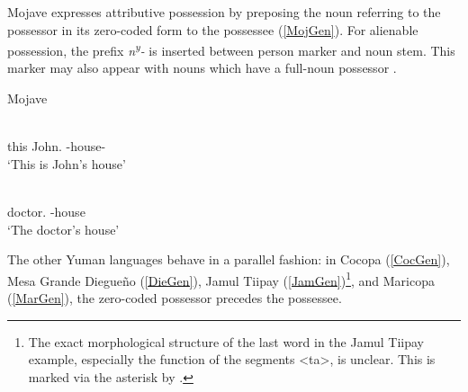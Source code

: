 Mojave expresses attributive possession by preposing the noun referring to the possessor in its zero-coded form  to the possessee (\ref{MojGen}).
For alienable possession, the prefix \emph{n\textsuperscript{y}-} is inserted between person marker and noun stem. 
This marker may also appear with nouns which have a full-noun possessor \citep[16--18]{Munro:1976}.

\begin{exe}\ex\label{MojGen} {Mojave} \citep[50, 18]{Munro:1976}\nopagebreak[4]
\begin{xlist}\ex\gll {} \textbf{} \\
this John.\acc{} \poss{}-house-\nom{}\\
`This is John's house' 

\ex\gll \textbf{} \\
doctor.\acc{} \poss{}-house\\
`The doctor's house' %
\end{xlist}
\end{exe}



%

The other Yuman languages behave in a parallel fashion:
in Cocopa (\ref{CocGen}), Mesa Grande Diegue\~no (\ref{DieGen}), Jamul Tiipay (\ref{JamGen})\footnote{The exact morphological structure of the last word in the Jamul Tiipay example, especially the function of the segments <ta>, is unclear. This is marked via the asterisk by \citet{Miller:2001}.}, and Maricopa (\ref{MarGen}), the zero-coded possessor precedes the possessee.

